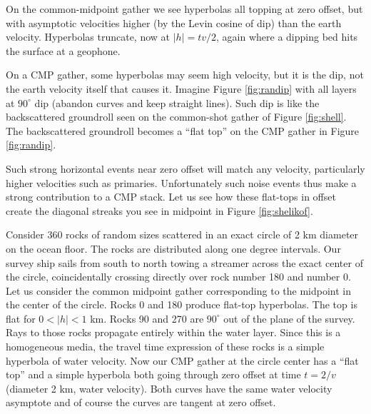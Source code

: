 \par
On the common-midpoint gather we see 
hyperbolas all topping at zero offset,
but with asymptotic velocities
higher (by the Levin cosine of dip)
than the earth velocity.
Hyperbolas truncate, now at $|h| = tv/2 $,
again where a dipping bed hits the surface at a geophone.


\par
On a CMP gather, some hyperbolas may seem high velocity,
but it is the dip, not the earth velocity itself that causes it.
Imagine Figure \ref{fig:randip} with all layers at $90^\circ$ dip
(abandon curves and keep straight lines).
Such dip is like the backscattered groundroll
seen on the common-shot gather of Figure \ref{fig:shell}.
The backscattered groundroll
becomes a ``flat top'' on
the CMP gather in Figure \ref{fig:randip}.

\par
{}
Such strong horizontal events near zero offset
will match any velocity,
particularly higher velocities such as primaries.
Unfortunately such noise events
thus make a strong contribution to a CMP stack.
Let us see how these flat-tops in offset create
the diagonal streaks you see in midpoint in Figure \ref{fig:shelikof}.

\par
Consider 360 rocks of random sizes scattered in an exact
circle of 2 km diameter on the ocean floor.
The rocks are distributed along one degree intervals.
Our survey ship sails from south to north
towing a streamer across the exact center of the circle,
coincidentally crossing directly over rock number 180 and number 0.
Let us consider the common midpoint gather corresponding
to the midpoint in the center of the circle.
Rocks 0 and 180 produce flat-top hyperbolas.
The top is flat for $0<|h|<1$ km.
Rocks 90 and 270 are $90^\circ$ out of the plane of the survey.
Rays to those rocks propagate entirely within the water layer.
Since this is a homogeneous media,
the travel time expression of these rocks
is a simple hyperbola of water velocity.
Now our CMP gather at the circle center has
a ``flat top'' and a simple hyperbola
both going through zero offset at time $t=2/v$ (diameter 2 km, water velocity).
Both curves have the same water velocity asymptote
and of course the curves are tangent at zero offset.

